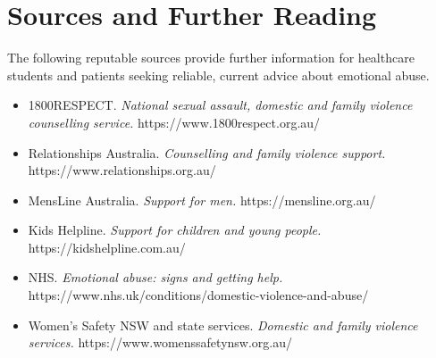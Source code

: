 \section*{Sources and Further Reading}
The following reputable sources provide further information for healthcare students and patients seeking reliable, current advice about emotional abuse.
\begin{itemize}
    \item 1800RESPECT. \textit{National sexual assault, domestic and family violence counselling service.} https://www.1800respect.org.au/
    \item Relationships Australia. \textit{Counselling and family violence support.} https://www.relationships.org.au/
    \item MensLine Australia. \textit{Support for men.} https://mensline.org.au/
    \item Kids Helpline. \textit{Support for children and young people.} https://kidshelpline.com.au/
    \item NHS. \textit{Emotional abuse: signs and getting help.} https://www.nhs.uk/conditions/domestic-violence-and-abuse/
    \item Women's Safety NSW and state services. \textit{Domestic and family violence services.} https://www.womenssafetynsw.org.au/
\end{itemize}
